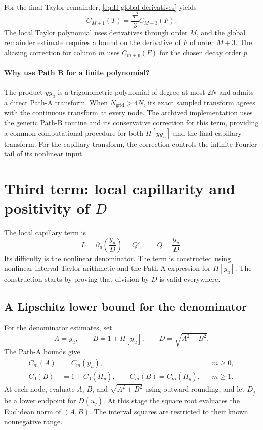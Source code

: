 \documentclass[11pt]{article}
\numberwithin{equation}{section}
\newcommand{\HH}{H_y}
\newcommand{\Ngrid}{N_{\mathrm{grid}}}
\begin{document}
For the final Taylor remainder, \eqref{eq:H-global-derivatives} yields
\begin{equation}
 \boxed{C_{M+1}(T)=\frac{\pi^2}{3}C_{M+3}(F).}
 \label{eq:T-remainder-bound}
\end{equation}
The local Taylor polynomial uses derivatives through order $M$, and the
global remainder estimate requires a bound on the derivative of $F$ of
order $M+3$. The aliasing correction for column $m$ uses $C_{m+p}(F)$
for the chosen decay order $p$.

\paragraph{Why use Path B for a finite polynomial?}
The product $yy_u$ is a trigonometric polynomial of degree at most $2N$
and admits a direct Path-A transform. When $\Ngrid>4N$, its exact
sampled transform agrees with the continuous transform at every node.
The archived implementation uses the generic Path-B routine and its
conservative correction for this term, providing a common computational
procedure for both $H[yy_u]$ and the final capillary transform. For the
capillary transform, the correction controls the infinite Fourier tail
of its nonlinear input.

\section{Third term: local capillarity and positivity of \texorpdfstring{$D$}{D}}
\label{sec:local-capillary}

The local capillary term is
\begin{equation}
 L=\partial_u\!\left(\frac{y_u}{D}\right)=Q',\qquad
 Q=\frac{y_u}{D}.
 \label{eq:L}
\end{equation}
Its difficulty is the nonlinear denominator. The term is constructed
using nonlinear interval Taylor arithmetic and the Path-A expression for
$H[y_u]$. The construction starts by proving that division by $D$ is
valid everywhere.

\subsection{A Lipschitz lower bound for the denominator}
\label{sec:D-positive}

For the denominator estimates, set
\begin{equation}
 A=y_u,\qquad B=1+H[y_u],\qquad D=\sqrt{A^2+B^2}.
 \label{eq:denominator-shorthands}
\end{equation}
The Path-A bounds give
\begin{equation}
 \begin{aligned}
 C_m(A)&=C_m(y_u),&&m\geq0,\\
 C_0(B)&=1+C_0(\HH),\qquad
 C_m(B)=C_m(\HH),&&m\geq1.
 \end{aligned}
 \label{eq:AB-bounds}
\end{equation}
At each node, evaluate $A$, $B$, and $\sqrt{A^2+B^2}$ using outward
rounding, and let $\underline D_j$ be a lower endpoint for $D(u_j)$.
At this stage the square root evaluates the Euclidean norm of $(A,B)$.
The interval squares are restricted to their known nonnegative range.
\end{document}
